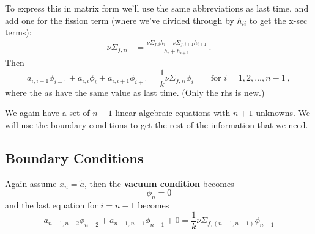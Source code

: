 \documentclass[12pt]{article}
\begin{document}
To express this in matrix form we'll use the same abbreviations as last time, and add one for the fission term (where we've divided through by $h_{ii}$ to get the x-sec terms):
\begin{align}
\nu\Sigma_{f,ii} &= \frac{\nu\Sigma_{f,i}h_i + \nu\Sigma_{f,i+1}h_{i+1}}{h_i + h_{i+1}} \:.\nonumber
\end{align}
%
Then
%
\[a_{i,i-1} \phi_{i-1} + a_{i,i}\phi_i + a_{i, i+1} \phi_{i+1} = \frac{1}{k}\nu\Sigma_{f,ii} \phi_i \qquad \text{for } i = 1, 2, \dots, n-1\:,\]
%
where the $a$s have the same value as last time. (Only the rhs is new.)
%

We again have a set of $n-1$ linear algebraic equations with $n+1$ unknowns. We will use the boundary conditions to get the rest of the information that we need.


\subsection*{Boundary Conditions}

Again assume $x_n = \tilde{a}$, then the \textbf{vacuum condition} becomes
\[\phi_n = 0\]
and the last equation for $i=n-1$ becomes
\[a_{n-1,n-2} \phi_{n-2} + a_{n-1,n-1}\phi_{n-1} + 0 = \frac{1}{k}\nu\Sigma_{f,(n-1,n-1)} \phi_{n-1}\]
\end{document}
